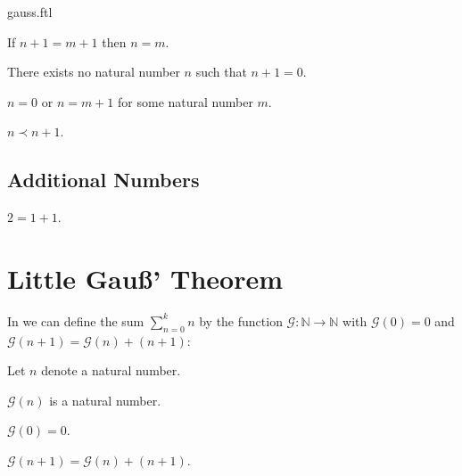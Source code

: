 \documentclass[english]{article}
\newcommand{\gauss}{\mathcal{G}}
\begin{document}
\begin{smodule}{gauss.ftl}
\begin{forthel}
  \begin{axiom}[title=Peano Axiom I]
    If $n + 1 =  m + 1$ then $n = m$.
  \end{axiom}

  \begin{axiom}[title=Peano Axiom II]
    There exists no natural number $n$ such that $n + 1 = 0$.
  \end{axiom}

  \begin{axiom}[title=Peano Axiom III]
    $n = 0$ or $n = m + 1$ for some natural number $m$.
  \end{axiom}

  \begin{axiom}[title=Induction Axiom]
    $n \prec n + 1$.
  \end{axiom}
\end{forthel}


\subsection{Additional Numbers}

\begin{forthel}
  \begin{definition}
    $2 = 1 + 1$.
  \end{definition}
\end{forthel}


\section{Little Gauß' Theorem}

In \Naproche we can define the sum $\sum_{n = 0}^k n$ by the function
$\gauss : \mathbb{N} \to \mathbb{N}$ with $\gauss(0) = 0$ and
$\gauss(n + 1) = \gauss(n) + (n + 1)$:

\begin{forthel}
  Let $n$ denote a natural number.

  \begin{signature*}
    $\gauss(n)$ is a natural number.
  \end{signature*}

  \begin{axiom*}
    $\gauss(0) = 0$.
  \end{axiom*}

  \begin{axiom*}
    $\gauss(n + 1) = \gauss(n) + (n + 1)$.
  \end{axiom*}
\end{forthel}


\end{smodule}
\end{document}
